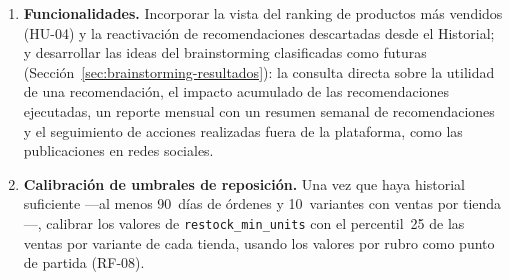 \begin{enumerate}
    \item \textbf{Funcionalidades.} Incorporar la vista del ranking de productos más vendidos (HU-04) y la reactivación de recomendaciones descartadas desde el Historial; y desarrollar las ideas del brainstorming clasificadas como futuras (Sección~\ref{sec:brainstorming-resultados}): la consulta directa sobre la utilidad de una recomendación, el impacto acumulado de las recomendaciones ejecutadas, un reporte mensual con un resumen semanal de recomendaciones y el seguimiento de acciones realizadas fuera de la plataforma, como las publicaciones en redes sociales.
    \item \textbf{Calibración de umbrales de reposición.} Una vez que haya historial suficiente ---al menos 90~días de órdenes y 10~variantes con ventas por tienda---, calibrar los valores de \texttt{restock\_min\_units} con el percentil~25 de las ventas por variante de cada tienda, usando los valores por rubro como punto de partida (RF-08).
\end{enumerate}
